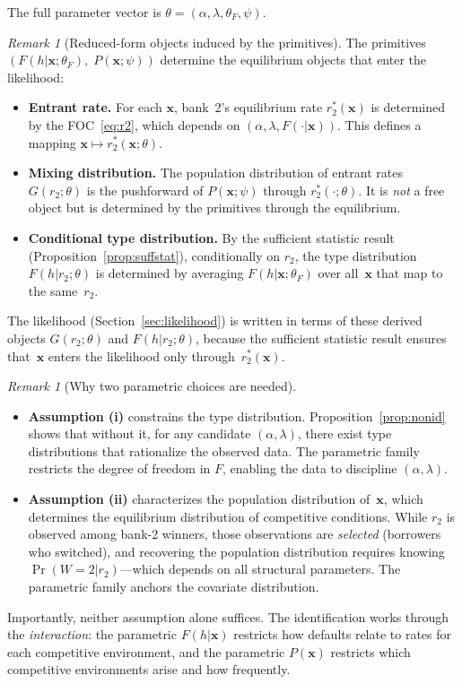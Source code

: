 \documentclass[12pt]{article}
\theoremstyle{plain}
\theoremstyle{plain}
\theoremstyle{definition}  %
\theoremstyle{remark}  %
\newtheorem{remark}[thm]{Remark}  %
\begin{document}
The full parameter vector is $\theta = (\alpha, \lambda, \theta_F, \psi)$.

\begin{remark}[Reduced-form objects induced by the primitives]\label{rem:induced}
The primitives $(F(h|\mathbf{x}; \theta_F),\; P(\mathbf{x}; \psi))$ determine the equilibrium objects that enter the likelihood:
\begin{itemize}
    \item \textbf{Entrant rate.}  For each $\mathbf{x}$, bank~2's equilibrium rate $r_2^*(\mathbf{x})$ is determined by the FOC~\eqref{eq:r2}, which depends on $(\alpha, \lambda, F(\cdot|\mathbf{x}))$.  This defines a mapping $\mathbf{x} \mapsto r_2^*(\mathbf{x}; \theta)$.
    \item \textbf{Mixing distribution.} The population distribution of entrant rates $G(r_2; \theta)$ is the pushforward of $P(\mathbf{x}; \psi)$ through $r_2^*(\cdot; \theta)$.  It is \emph{not} a free object but is determined by the primitives through the equilibrium.
    \item \textbf{Conditional type distribution.}  By the sufficient statistic result (Proposition~\ref{prop:suffstat}), conditionally on $r_2$, the type distribution $F(h|r_2; \theta)$ is determined by averaging $F(h|\mathbf{x}; \theta_F)$ over all~$\mathbf{x}$ that map to the same~$r_2$.
\end{itemize}
The likelihood (Section~\ref{sec:likelihood}) is written in terms of these derived objects $G(r_2; \theta)$ and $F(h|r_2; \theta)$, because the sufficient statistic result ensures that~$\mathbf{x}$ enters the likelihood only through~$r_2^*(\mathbf{x})$.
\end{remark}

\begin{remark}[Why two parametric choices are needed]\label{rem:why_two}
\begin{itemize}
    \item \textbf{Assumption (i)} constrains the type distribution.  Proposition~\ref{prop:nonid} shows that without it, for any candidate $(\alpha, \lambda)$, there exist type distributions that rationalize the observed data.  The parametric family restricts the degree of freedom in $F$, enabling the data to discipline $(\alpha, \lambda)$.
    \item \textbf{Assumption (ii)} characterizes the population distribution of~$\mathbf{x}$, which determines the equilibrium distribution of competitive conditions.  While $r_2$ is observed among bank-2 winners, those observations are \emph{selected} (borrowers who switched), and recovering the population distribution requires knowing $\Pr(W\!=\!2|r_2)$---which depends on all structural parameters.  The parametric family anchors the covariate distribution.
\end{itemize}
Importantly, neither assumption alone suffices.  The identification works through the \emph{interaction}: the parametric $F(h|\mathbf{x})$ restricts how defaults relate to rates for each competitive environment, and the parametric $P(\mathbf{x})$ restricts which competitive environments arise and how frequently.
\end{remark}
\end{document}
